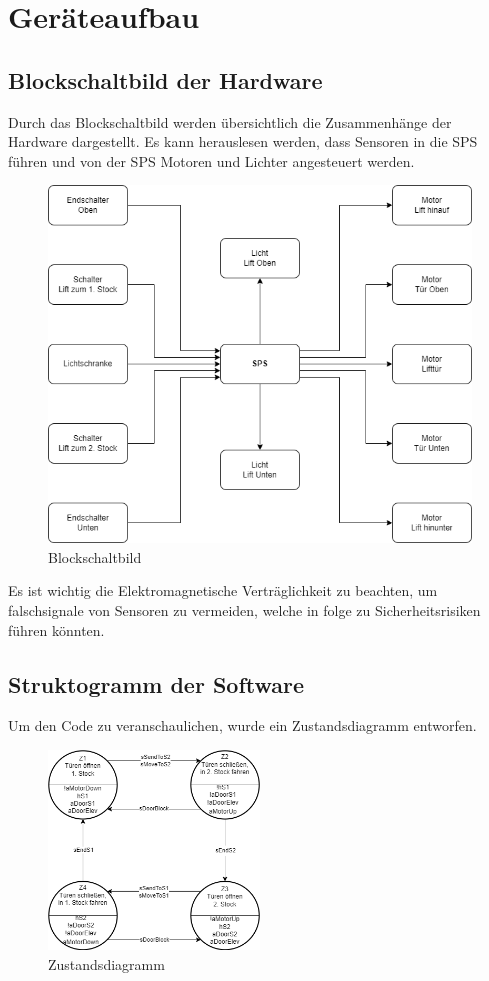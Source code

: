 \section{Geräteaufbau}

\subsection{Blockschaltbild der Hardware}

Durch das Blockschaltbild werden übersichtlich die Zusammenhänge der Hardware dargestellt. Es kann herauslesen werden, dass Sensoren in die SPS führen und von der SPS Motoren und Lichter angesteuert werden.

\begin{figure}[H]
    \centering
    \includegraphics[width=\textwidth]{./images/Blockschaltbild.png}
    \caption[Blockschaltbild]{Blockschaltbild}
\end{figure}

Es ist wichtig die Elektromagnetische Verträglichkeit zu beachten, um falschsignale von Sensoren zu vermeiden, welche in folge zu Sicherheitsrisiken führen könnten.

\newpage

\subsection{Struktogramm der Software}

Um den Code zu veranschaulichen, wurde ein Zustandsdiagramm entworfen.

\begin{figure}[H]
    \centering
    \includegraphics[width=0.5\textwidth]{./images/Zustandsdiagramm.png}
    \caption[Zustandsdiagramm]{Zustandsdiagramm}
\end{figure}